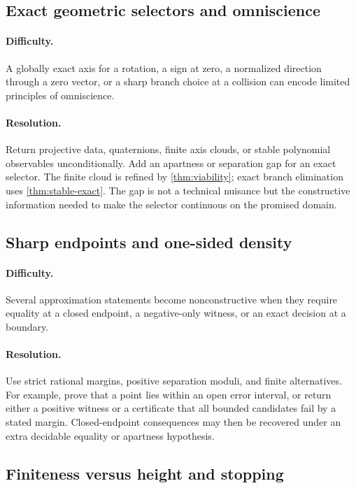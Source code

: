 \subsection{Exact geometric selectors and omniscience}

\paragraph{Difficulty.}
A globally exact axis for a rotation, a sign at zero, a normalized direction through a zero vector, or a sharp branch choice at a collision can encode limited principles of omniscience.

\paragraph{Resolution.}
Return projective data, quaternions, finite axis clouds, or stable polynomial observables unconditionally.  Add an apartness or separation gap for an exact selector.  The finite cloud is refined by \cref{thm:viability}; exact branch elimination uses \cref{thm:stable-exact}.  The gap is not a technical nuisance but the constructive information needed to make the selector continuous on the promised domain.

\subsection{Sharp endpoints and one-sided density}

\paragraph{Difficulty.}
Several approximation statements become nonconstructive when they require equality at a closed endpoint, a negative-only witness, or an exact decision at a boundary.

\paragraph{Resolution.}
Use strict rational margins, positive separation moduli, and finite alternatives.  For example, prove that a point lies within an open error interval, or return either a positive witness or a certificate that all bounded candidates fail by a stated margin.  Closed-endpoint consequences may then be recovered under an extra decidable equality or apartness hypothesis.

\subsection{Finiteness versus height and stopping}
\label{sec:height-obstruction}

